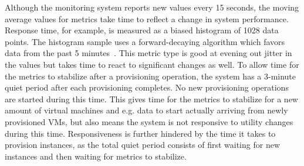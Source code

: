 \documentclass[english]{tktltiki2}
\theoremstyle{definition}
\theoremstyle{remark}
\begin{document}
Although the monitoring system reports new values every 15 seconds, the moving
average values for metrics take time to reflect a change in system performance.
Response time, for example, is measured as a biased histogram of 1028 data
points. The histogram sample uses a forward-decaying algorithm which favors data
from the past 5 minutes~\cite{forwardDecayHistogram}\cite{codahaleHistogram}.
This metric type is good at evening out jitter in the values but takes time to
react to significant changes as well. To allow time for the metrics to stabilize
after a provisioning operation, the system has a 3-minute quiet period after
each provisioning completes. No new provisioning operations are started during
this time. This gives time for the metrics to stabilize for a new amount of
virtual machines and e.g. data to start actually arriving from newly provisioned
VMs, but also means the system is not responsive to utility changes during this
time. Responsiveness is further hindered by the time it takes to provision instances, as the total quiet period consists of first waiting for new instances and then waiting for metrics to stabilize.

	\begin{table}[h]
	    \caption{Server applications and tools used in the prototype.}
	    \label{table:componentVersions}
	\end{table}
\end{document}
